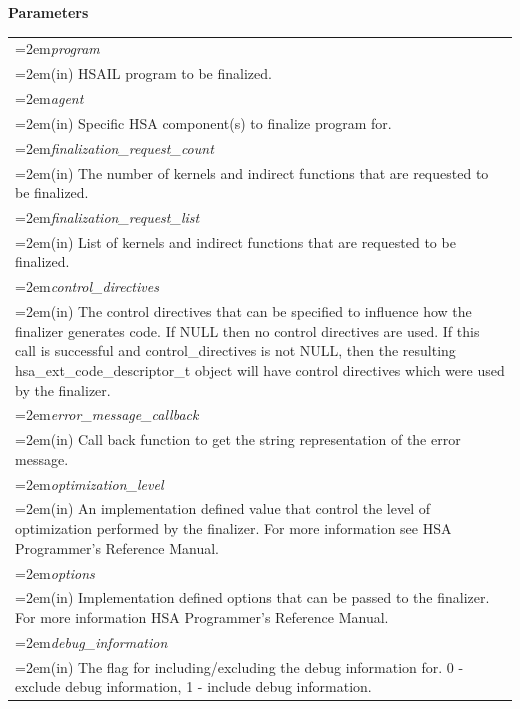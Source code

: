 \documentclass[final]{book}
\newcommand{\hsaarg}[1]{\textit{#1}}
\begin{document}
\noindent\textbf{Parameters}\\[-6mm]
\noindent\begin{longtable}{@{}>{\hangindent=2em}p{\textwidth}}
\hsaarg{program}\\\hspace{2em}(in) HSAIL program to be finalized.\\[2mm]
\hsaarg{agent}\\\hspace{2em}(in) Specific HSA component(s) to finalize program for.\\[2mm]
\hsaarg{finalization_\-request_\-count}\\\hspace{2em}(in) The number of kernels and indirect functions that are requested to be finalized.\\[2mm]
\hsaarg{finalization_\-request_\-list}\\\hspace{2em}(in) List of kernels and indirect functions that are requested to be finalized.\\[2mm]
\hsaarg{control_\-directives}\\\hspace{2em}(in) The control directives that can be specified to influence how the finalizer generates code. If NULL then no control directives are used. If this call is successful and control_\-directives is not NULL, then the resulting hsa_\-ext_\-code_\-descriptor_\-t object will have control directives which were used by the finalizer.\\[2mm]
\hsaarg{error_\-message_\-callback}\\\hspace{2em}(in) Call back function to get the string representation of the error message.\\[2mm]
\hsaarg{optimization_\-level}\\\hspace{2em}(in) An implementation defined value that control the level of optimization performed by the finalizer. For more information see HSA Programmer's Reference Manual.\\[2mm]
\hsaarg{options}\\\hspace{2em}(in) Implementation defined options that can be passed to the finalizer. For more information HSA Programmer's Reference Manual.\\[2mm]
\hsaarg{debug_\-information}\\\hspace{2em}(in) The flag for including/excluding the debug information for. 0 - exclude debug information, 1 - include debug information.
\end{longtable}
\end{document}
